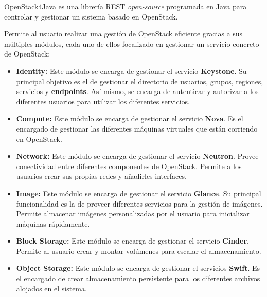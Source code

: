 OpenStack4Java\cite{openstack4jbib} es una librería \ac{REST} \textit{open-source} programada en Java para controlar y gestionar un sistema basado en OpenStack.

Permite al usuario realizar una gestión de OpenStack eficiente gracias a sus múltiples módulos, cada uno de ellos focalizado en gestionar un servicio concreto de OpenStack:

\begin{itemize}
	\item \textbf{Identity:} Este módulo se encarga de gestionar el servicio \textbf{Keystone}. Su principal objetivo es el de gestionar el directorio de usuarios, grupos, regiones, servicios y \textbf{endpoints}. Así mismo, se encarga de autenticar y autorizar a los diferentes usuarios para utilizar los diferentes servicios.
	
	\item \textbf{Compute:} Este módulo se encarga de gestionar el servicio \textbf{Nova}. Es el encargado de gestionar las diferentes máquinas virtuales que están corriendo en OpenStack.
	
	\item \textbf{Network:} Este módulo se encarga de gestionar el servicio \textbf{Neutron}. Provee conectividad entre diferentes componentes de OpenStack. Permite a los usuarios crear sus propias redes y añadirles interfaces.
	
	\item \textbf{Image:} Este módulo se encarga de gestionar el servicio \textbf{Glance}. Su principal funcionalidad es la de proveer diferentes servicios para la gestión de imágenes. Permite almacenar imágenes personalizadas por el usuario para inicializar máquinas rápidamente.
	
	\item \textbf{Block Storage:} Este módulo se encarga de gestionar el servicio \textbf{Cinder}. Permite al usuario crear y montar volúmenes para escalar el almacenamiento.
	
	\item \textbf{Object Storage:} Este módulo se encarga de gestionar el servicios \textbf{Swift}. Es el encargado de crear almacenamiento persistente para los diferentes archivos alojados en el sistema.
\end{itemize}


